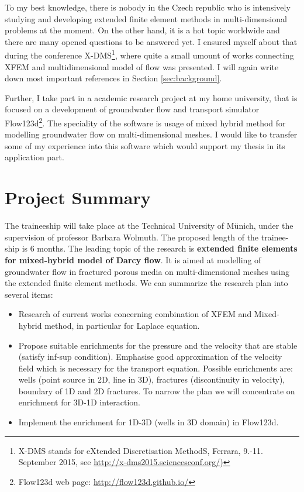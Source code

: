 \documentclass{sna}
\begin{document}
To my best knowledge, there is nobody in the Czech republic who is intensively studying and developing extended finite element
methods in multi-dimensional problems at the moment. On the other hand, it is a hot topic worldwide and there
are many opened questions to be answered yet. I ensured myself about that during the conference X-DMS\footnote{X-DMS stands for eXtended 
Discretisation MethodS, Ferrara, 9.-11. September 2015, see \url{http://x-dms2015.sciencesconf.org/})}, where
quite a small umount of works connecting XFEM and multidimensional model of flow was presented. 
I will again write down most important references in Section \ref{sec:background}.

Further, I take part in a academic research project at my home university, that is focused on a development
of groundwater flow and transport simulator Flow123d\footnote{Flow123d web page: \url{http://flow123d.github.io/}}. 
The speciality of the software is usage of mixed hybrid method
for modelling groundwater flow on multi-dimensional meshes. I would like to transfer some of my experience
into this software which would support my thesis in its application part.

\section{Project Summary}
The traineeship will take place at the Technical University of M{\" u}nich, under the supervision of professor
Barbara Wolmuth. The proposed length of the trainee-ship is 6 months. The leading topic of the research is 
\textbf{extended finite elements for mixed-hybrid model of Darcy flow}. It is aimed at modelling of groundwater 
flow in fractured porous media on multi-dimensional meshes using the extended finite element methods. 
We can summarize the research plan into several items:
\begin{itemize}
  \item Research of current works concerning combination of XFEM and Mixed-hybrid method, in particular for Laplace equation. 
  \item Propose suitable enrichments for the pressure and the velocity that are stable (satisfy inf-sup condition). 
        Emphasise good approximation of the velocity field which is necessary for the transport equation. 
        Possible enrichments are: wells (point source in 2D, line in 3D), fractures (discontinuity in velocity), 
        boundary of 1D and 2D  fractures. To narrow the plan we will concentrate on enrichment for 3D-1D interaction.
  \item Implement the enrichment for 1D-3D (wells in 3D domain) in Flow123d.
\end{itemize}
\end{document}

